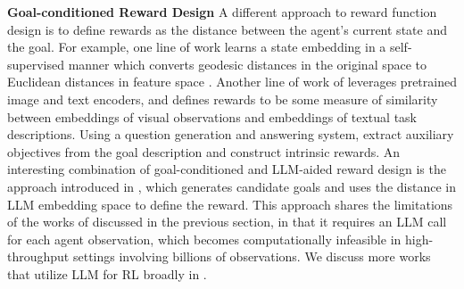 \textbf{Goal-conditioned Reward Design}
A different approach to reward function design is to define rewards as the distance between the agent's current state and  the goal. For example, one line of work learns a state embedding in a self-supervised manner which converts geodesic distances in the original space to Euclidean distances in feature space  \citep{wu2018the, DBLP:journals/corr/abs-2107-05545, gomez2024properlaplacianrepresentationlearning}.
Another line of work of \citep{fan2022minedojo, rocamonde2023vision, adeniji2023languagerewardmodulationpretraining,kim2024guide} leverages pretrained image and text encoders, and defines rewards to be some measure of similarity between embeddings of visual observations and embeddings of textual task descriptions.
%
Using a question generation and answering system, \citet{carta2022eager} extract auxiliary objectives from the goal description and construct intrinsic rewards.
%
An interesting combination of goal-conditioned and LLM-aided reward design is the \ellm approach introduced in \citet{pmlr-v202-du23f}, which generates candidate goals and uses the distance in LLM embedding space to define the reward. 
%
%
This approach shares the limitations of the works of \citet{kwon2023reward, chu2023accelerating} discussed in the previous section, in that it requires an LLM call for each agent observation, which becomes computationally infeasible in high-throughput settings involving billions of observations.
%
We discuss more works that utilize LLM for RL broadly in .




%
%
%
%
